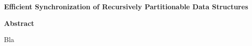 
\thispagestyle{plain}
\begin{center}
    \Large
    \textbf{Efficient Synchronization of Recursively Partitionable Data Structures}
       
    \vspace{0.9cm}
    \textbf{Abstract}
\end{center}

Bla

%
%
